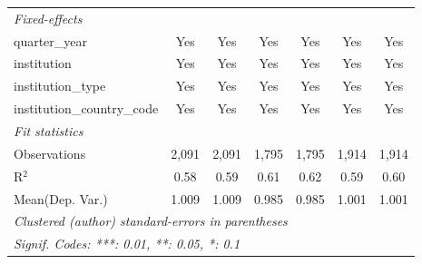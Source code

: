 \begin{tabular}{lcccccc}
   \midrule
   \emph{Fixed-effects}\\
   quarter\_year                      & Yes     & Yes           & Yes     & Yes           & Yes     & Yes\\  
   institution                        & Yes     & Yes           & Yes     & Yes           & Yes     & Yes\\  
   institution\_type                  & Yes     & Yes           & Yes     & Yes           & Yes     & Yes\\  
   institution\_country\_code         & Yes     & Yes           & Yes     & Yes           & Yes     & Yes\\  
   \midrule
   \emph{Fit statistics}\\
   Observations                       & 2,091   & 2,091         & 1,795   & 1,795         & 1,914   & 1,914\\  
   R$^2$                              & 0.58    & 0.59          & 0.61    & 0.62          & 0.59    & 0.60\\  
Mean(Dep. Var.) & 1.009 & 1.009 & 0.985 & 0.985 & 1.001 & 1.001 \\
   \midrule \midrule
   \multicolumn{7}{l}{\emph{Clustered (author) standard-errors in parentheses}}\\
   \multicolumn{7}{l}{\emph{Signif. Codes: ***: 0.01, **: 0.05, *: 0.1}}\\
\end{tabular}
\par\endgroup
